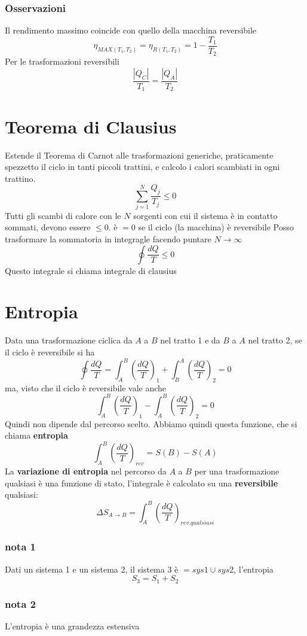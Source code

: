 \documentclass[a4paper]{report}
\begin{document}
  \subsubsection{Osservazioni}
  Il rendimento massimo coincide con quello della macchina reversibile
  $$ \eta_{MAX(T_1,T_2)} = \eta_{R(T_1,T_2)} = 1-\frac{T_1}{T_2} $$
  Per le trasformazioni reversibili
  $$ \frac{|Q_C|}{T_1} = \frac{|Q_A|}{T_2}$$

  \section{Teorema di Clausius}
  Estende il Teorema di Carnot alle trasformazioni generiche, praticamente spezzetto il ciclo in tanti piccoli trattini, e calcolo i calori scambiati in ogni trattino.
  $$ \sum_{j=1}^N \frac{Q_j}{T_j} \leq 0 $$
  Tutti gli scambi di calore con le $N$ sorgenti con cui il sistema è in contatto sommati, devono essere $\leq 0$. è $=0$ se il ciclo (la macchina) è reversibile
  Posso trasformare la sommatoria in integragle facendo puntare $N \rightarrow \infty$
  $$ \oint \frac{dQ}{T} \leq 0 $$
  Questo integrale si chiama integrale di clausius

  \section{Entropia}
  Data una trasformazione ciclica da $A$ a $B$ nel tratto 1 e da $B$ a $A$ nel tratto 2, se il ciclo è reversibile si ha
  $$ \oint \frac{dQ}{T} = \int_A^B (\frac{dQ}{T})_1 + \int_B^A (\frac{dQ}{T})_2 = 0$$
  ma, visto che il ciclo è reversibile vale anche
  $$ \int_A^B (\frac{dQ}{T})_1 - \int_A^B (\frac{dQ}{T})_2 = 0$$
  Quindi non dipende dal percorso scelto. Abbiamo quindi questa funzione, che si chiama \textbf{entropia}
  $$ \int_A^B (\frac{dQ}{T})_{rev} = S(B) -S(A) $$
  La \textbf{variazione di entropia} nel percorso da $A$ a $B$ per una trasformazione qualsiasi è una funzione di stato, l'integrale è calcolato su una \textbf{reversibile} qualsiasi:
  $$ \Delta S_{A \rightarrow B} = \int_A^B (\frac{dQ}{T})_{rev. qualsiasi} $$
  \subsubsection{nota 1}
  Dati un sistema 1 e un sistema 2, il sistema 3 è $= sys1 \cup sys2$, l'entropia
  $$ S_3 = S_1 + S_2 $$
  \subsubsection{nota 2}
  L'entropia è una grandezza estensiva
\end{document}
